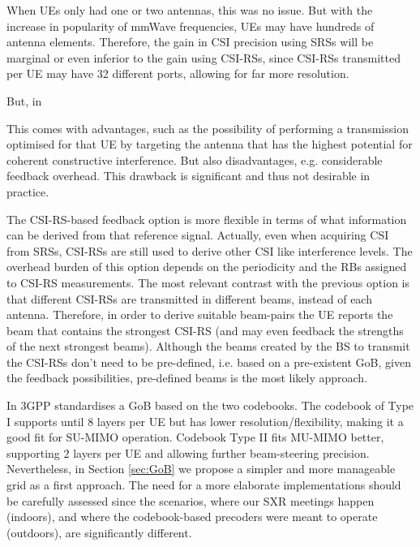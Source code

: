 When UEs only had one or two antennas, this was no issue. But with the increase in popularity of mmWave frequencies, UEs may have hundreds of antenna elements. Therefore, the gain in CSI precision using SRSs will be marginal or even inferior to the gain using CSI-RSs, since CSI-RSs transmitted per UE may have 32 different ports, allowing for far more resolution. 

But, in 





This comes with advantages, such as the possibility of performing a transmission optimised for that UE by targeting the antenna that has the highest potential for coherent constructive interference. But also disadvantages, e.g. considerable feedback overhead. This drawback is significant and thus not desirable in practice.



The CSI-RS-based feedback option is more flexible in terms of what information can be derived from that reference signal. Actually, even when acquiring CSI from SRSs, CSI-RSs are still used to derive other CSI like interference levels. The overhead burden of this option depends on the periodicity and the \acp{RB} assigned to CSI-RS measurements. The most relevant contrast with the previous option is that different CSI-RSs are transmitted in different beams, instead of each antenna. Therefore, in order to derive suitable beam-pairs the UE reports the beam that contains the strongest CSI-RS (and may even feedback the strengths of the next strongest beams). Although the beams created by the BS to transmit the CSI-RSs don't need to be pre-defined, i.e. based on a pre-existent GoB, given the feedback possibilities, pre-defined beams is the most likely approach.


In \cite{3gpp-codebooks} 3GPP standardises a GoB based on the two codebooks. The codebook of Type I supports until 8 layers per UE but has lower resolution/flexibility, making it a good fit for SU-MIMO operation. Codebook Type II fits MU-MIMO better, supporting 2 layers per UE and allowing further beam-steering precision. 
Nevertheless, in Section \ref{sec:GoB} we propose a simpler and more manageable grid as a first approach. The need for a more elaborate implementations should be carefully assessed since the scenarios, where our SXR meetings happen (indoors), and where the codebook-based precoders were meant to operate (outdoors), are significantly different.